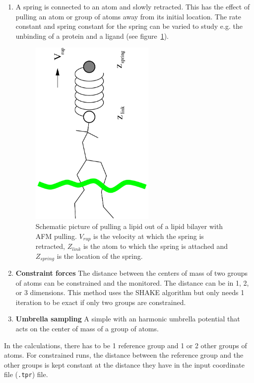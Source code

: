 \begin{enumerate}
\item{\textbf{}} A spring is connected to an atom and
slowly retracted. This has the effect of pulling an atom or group of
atoms away from its initial location. The rate constant and spring
constant for the spring can be varied to study e.g. the unbinding of a
protein and a ligand (see figure~\ref{fi:pull}). 
\begin{figure}
\centerline{\includegraphics[width=6cm,angle=270]{plots/pull}}
\caption{Schematic picture of pulling a lipid out of a lipid bilayer
with AFM pulling. $V_{rup}$ is the velocity at which the spring is
retracted, $Z_{link}$ is the atom to which the spring is attached and
$Z_{spring}$ is the location of the spring.}
\label{fi:pull} 
\end{figure}
\item{\textbf{Constraint forces}} The distance between the centers of
mass of two groups of atoms can be constrained and the 
 monitored.
The distance can be in 1, 2, or 3 dimensions. This method
uses the SHAKE algorithm but only needs 1 iteration to be
exact if only two groups are constrained. 
\item{\textbf{Umbrella sampling}} A simple
 with an
harmonic umbrella potential that acts on the center of mass of a group
of atoms.
\end{enumerate}

In the calculations, there has to be 1 reference group and 1 or 2
other groups of atoms. For constrained runs, the distance between the
reference group and the other groups is kept constant at the distance
they have in the input coordinate file ({\tt .tpr}) file.

